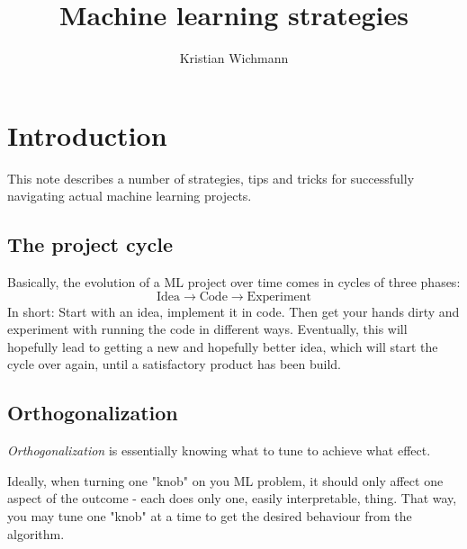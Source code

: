 \documentclass[12pt, a4paper]{article}
\title{Machine learning strategies}
\author{Kristian Wichmann}
\numberwithin{equation}{section}
\begin{document}
\maketitle

\section{Introduction}
This note describes a number of strategies, tips and tricks for successfully navigating actual machine learning projects.

\subsection{The project cycle}
Basically, the evolution of a ML project over time comes in cycles of three phases:
\begin{equation}
\textrm{Idea}\rightarrow\textrm{Code}\rightarrow\textrm{Experiment}
\end{equation}
In short: Start with an idea, implement it in code. Then get your hands dirty and experiment with running the code in different ways. Eventually, this will hopefully lead to getting a new and hopefully better idea, which will start the cycle over again, until a satisfactory product has been build.

\subsection{Orthogonalization}
\textit{Orthogonalization} is essentially knowing what to tune to achieve what effect.

Ideally, when turning one "knob" on you ML problem, it should only affect one aspect of the outcome - each does only one, easily interpretable, thing. That way, you may tune one "knob" at a time to get the desired behaviour from the algorithm.
\end{document}
